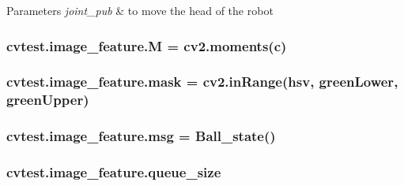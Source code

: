 \begin{DoxyParams}{Parameters}
{\em joint\+\_\+pub} & to move the head of the robot \\
\hline
\end{DoxyParams}
\subsubsection[{\texorpdfstring{M}{M}}]{\setlength{\rightskip}{0pt plus 5cm}cvtest.\+image\+\_\+feature.\+M = cv2.\+moments({\bf c})\hspace{0.3cm}{\ttfamily [static]}}\hypertarget{classcvtest_1_1image__feature_a0affcc52451defb08bf591514f2b2c64}{}\label{classcvtest_1_1image__feature_a0affcc52451defb08bf591514f2b2c64}
\subsubsection[{\texorpdfstring{mask}{mask}}]{\setlength{\rightskip}{0pt plus 5cm}cvtest.\+image\+\_\+feature.\+mask = cv2.\+in\+Range({\bf hsv}, {\bf green\+Lower}, {\bf green\+Upper})\hspace{0.3cm}{\ttfamily [static]}}\hypertarget{classcvtest_1_1image__feature_a40f58b7123cfe0573aa79c3831ff3f6a}{}\label{classcvtest_1_1image__feature_a40f58b7123cfe0573aa79c3831ff3f6a}
\subsubsection[{\texorpdfstring{msg}{msg}}]{\setlength{\rightskip}{0pt plus 5cm}cvtest.\+image\+\_\+feature.\+msg = Ball\+\_\+state()\hspace{0.3cm}{\ttfamily [static]}}\hypertarget{classcvtest_1_1image__feature_ad2980a48f7e0a2dc184f8bfa6dee1e8c}{}\label{classcvtest_1_1image__feature_ad2980a48f7e0a2dc184f8bfa6dee1e8c}
\subsubsection[{\texorpdfstring{queue\+\_\+size}{queue_size}}]{\setlength{\rightskip}{0pt plus 5cm}cvtest.\+image\+\_\+feature.\+queue\+\_\+size\hspace{0.3cm}{\ttfamily [static]}}\hypertarget{classcvtest_1_1image__feature_ae255c3c1c25d111c82a82e5bd02a5187}{}\label{classcvtest_1_1image__feature_ae255c3c1c25d111c82a82e5bd02a5187}
